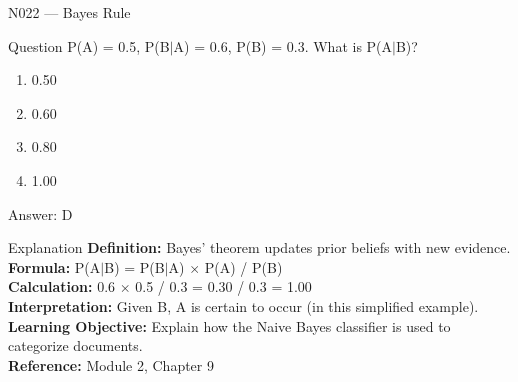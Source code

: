 \documentclass[aspectratio=169,8pt]{beamer}
\begin{document}
	\begin{frame}{N022 --- Bayes Rule}
		\begin{block}{Question}
			P(A) = 0.5, P(B$|$A) = 0.6, P(B) = 0.3. What is P(A$|$B)?
			\begin{enumerate}
				\item 0.50
				\item 0.60
				\item 0.80
				\item 1.00
			\end{enumerate}
		\end{block}
		\begin{exampleblock}{Answer: D}\end{exampleblock}
		\begin{block}{Explanation}
			\textbf{Definition:} Bayes' theorem updates prior beliefs with new evidence.\\
			\textbf{Formula:} P(A$|$B) = P(B$|$A) $\times$ P(A) / P(B)\\
			\textbf{Calculation:} 0.6 $\times$ 0.5 / 0.3 = 0.30 / 0.3 = 1.00\\
			\textbf{Interpretation:} Given B, A is certain to occur (in this simplified example).\\
			\textbf{Learning Objective:} Explain how the Naive Bayes classifier is used to categorize documents.\\
			\textbf{Reference:} Module 2, Chapter 9
		\end{block}
	\end{frame}
	
\end{document}
